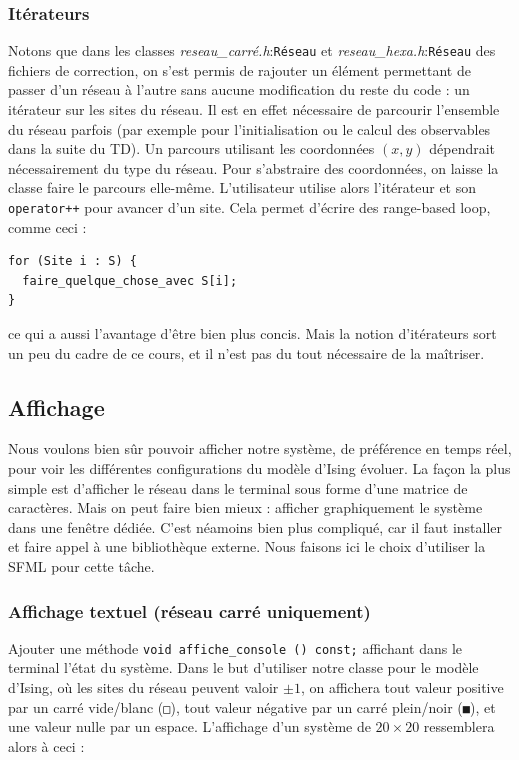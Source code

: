 \documentclass{book}
\newcommand{\inline}[1]{\texttt{#1}}
\def\filename{\emph}
\begin{document}
\begin{correction}
\subsubsection*{Itérateurs}

Notons que dans les classes \filename{reseau\_carré.h}:\inline{Réseau} et \filename{reseau\_hexa.h}:\inline{Réseau} des fichiers de correction, on s'est permis de rajouter un élément permettant de passer d'un réseau à l'autre sans aucune modification du reste du code : un itérateur sur les sites du réseau. Il est en effet nécessaire de parcourir l'ensemble du réseau parfois (par exemple pour l'initialisation ou le calcul des observables dans la suite du TD). Un parcours utilisant les coordonnées $(x,y)$ dépendrait nécessairement du type du réseau. Pour s'abstraire des coordonnées, on laisse la classe faire le parcours elle-même. L'utilisateur utilise alors l'itérateur et son \inline{operator++} pour avancer d'un site. Cela permet d'écrire des range-based loop, comme ceci :
\begin{verbatim}
for (Site i : S) {
  faire_quelque_chose_avec S[i];
}
\end{verbatim}
ce qui a aussi l'avantage d'être bien plus concis. Mais la notion d'itérateurs sort un peu du cadre de ce cours, et il n'est pas du tout nécessaire de la maîtriser.

\end{correction}

\subsection{Affichage}

Nous voulons bien sûr pouvoir afficher notre système, de préférence en temps réel, pour voir les différentes configurations du modèle d'Ising évoluer. La façon la plus simple est d'afficher le réseau dans le terminal sous forme d'une matrice de caractères. Mais on peut faire bien mieux : afficher graphiquement le système dans une fenêtre dédiée. C'est néamoins bien plus compliqué, car il faut installer et faire appel à une bibliothèque externe. Nous faisons ici le choix d'utiliser la SFML pour cette tâche.

\subsubsection{Affichage textuel (réseau carré uniquement)}

Ajouter une méthode \inline{void affiche_console () const;} affichant dans le terminal l'état du système. Dans le but d'utiliser notre classe pour le modèle d'Ising, où les sites du réseau peuvent valoir $\pm 1$, on affichera tout valeur positive par un carré vide/blanc (\texttt{□}), tout valeur négative par un carré plein/noir (\texttt{■}), et une valeur nulle par un espace. L'affichage d'un système de $20\times 20$ ressemblera alors à ceci :
\end{document}
